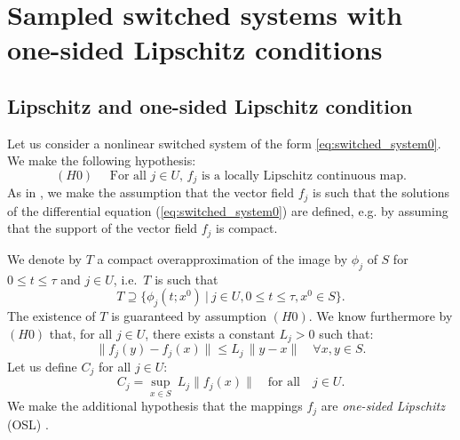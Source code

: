 \section{Sampled switched systems with one-sided Lipschitz conditions}\label{sec:OSL}
\subsection{Lipschitz and one-sided Lipschitz condition}\label{ss:OSC}
Let us consider a nonlinear switched system of the form \eqref{eq:switched_system0}.
We make the following hypothesis:
%
$$(H0)\quad  \mbox{ For all  $j\in U$, $f_j$ is a locally Lipschitz continuous map}.$$
%
As in \cite{girard2010approximately}, we make the assumption that 
the vector field $f_j$ is such that the solutions of the 
differential equation  (\ref{eq:switched_system0}) are defined, 
e.g. by assuming that the support of the vector field $f_j$ is compact.
% 
%




We denote by $T$ a compact overapproximation of the image by $\phi_j$ of $S$ for $0\leq t\leq \tau$ and $j\in U$, i.e.~$T$ is such that
$$ T\supseteq \{\phi_j(t;x^0) \ |\ j\in U, 0\leq t\leq\tau, x^0\in S\}.$$
The existence of $T$ is guaranteed by assumption $(H0)$. We know furthermore 
by $(H0)$ that, for all $j\in U$, there exists a constant $L_j>0$ such that:
\begin{equation}
\| f_j(y)-f_j(x) \| \leq L_j \, \|y-x\|\quad \forall x,y\in S.
\label{eq:lipschitz}
\end{equation}
Let us define $C_j$ for all $j\in U$:
\begin{equation}
C_j = \sup_{x\in S}\  L_j\|f_j(x)\|
\quad
\text{for all} \quad j\in U.
\label{eq:L}
\end{equation}
%
We make the additional hypothesis 
that the mappings $f_j$ are {\em one-sided Lipschitz} (OSL)
\cite{Donchev98}.

